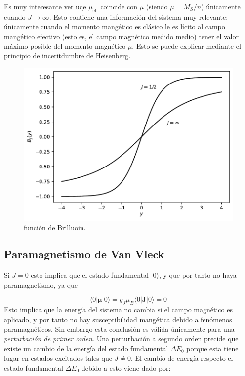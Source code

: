 \documentclass[12pt,a4paper]{book}
\numberwithin{equation}{section}
\numberwithin{figure}{section}
\newcommand{\eff}{\mathrm{eff}}
\newcommand{\Jn}{\mathbf{J}}
\newcommand{\mun}{\boldsymbol{\mu}}
\begin{document}
Es muy interesante ver uqe $\mu_\eff$ coincide con $\mu$ (siendo $\mu = M_S/n$) únicamente cuando $J\rightarrow \infty$. Esto contiene una información del sistema muy relevante: únicamente cuando el momento mangético es clásico le es lícito al campo mangético efectivo (esto es, el campo magnético medido medio) tener el valor máximo posible del momento magnético $\mu$. Esto se puede explicar mediante el principio de inceritdumbre de Heisenberg.

\begin{figure}[h!]
    \centering
    \includegraphics{Imagenes/02-Brillouin.pdf}
    \caption[scale=1]{función de Brilluoin.}
    \label{Fig:02-04-01}
\end{figure}

\subsection{Paramagnetismo de Van Vleck}

Si $J=0$ esto implica que el estado fundamental $|0\rangle$, y que por tanto no haya paramagnetismo, ya que

\begin{equation}
    \langle 0 | \mun | 0 \rangle = g_J \mu_B \langle 0 | \Jn |0 \rangle = 0
\end{equation}
Esto implica que la energía del sistema no cambia si el campo magnético es aplicado, y por tanto no hay susceptibilidad mangética debido a fenómenos paramagnéticos. Sin embargo esta conclusión es válida únicamente para una \textit{perturbación de primer orden}. Una perturbación a segundo orden precide que existe un cambio de la energía del estado fundamental $\Delta E_0$ porque esta tiene lugar en estados excitados tales que $J\neq 0$. El cambio de energía respecto el estado fundamental $\Delta E_0$ debido a esto viene dado por:
\end{document}
